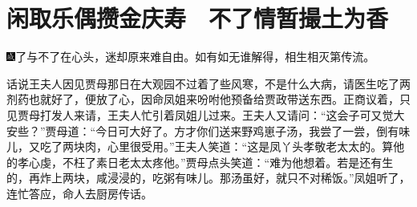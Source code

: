 

\chapter{闲取乐偶攒金庆寿　不了情暂撮土为香}


{\includegraphics[width=3mm]{../Images/00005}了与不了在心头，迷却原来难自由。如有如无谁解得，相生相灭第传流。}

话说王夫人因见贾母那日在大观园不过着了些风寒，不是什么大病，请医生吃了两剂药也就好了，便放了心，因命凤姐来吩咐他预备给贾政带送东西。正商议着，只见贾母打发人来请，王夫人忙引着凤姐儿过来。王夫人又请问：``这会子可又觉大安些？''贾母道：``今日可大好了。方才你们送来野鸡崽子汤，我尝了一尝，倒有味儿，又吃了两块肉，心里很受用。''王夫人笑道：``这是凤丫头孝敬老太太的。算他的孝心虔，不枉了素日老太太疼他。''贾母点头笑道：``难为他想着。若是还有生的，再炸上两块，咸浸浸的，吃粥有味儿。那汤虽好，就只不对稀饭。''凤姐听了，连忙答应，命人去厨房传话。

